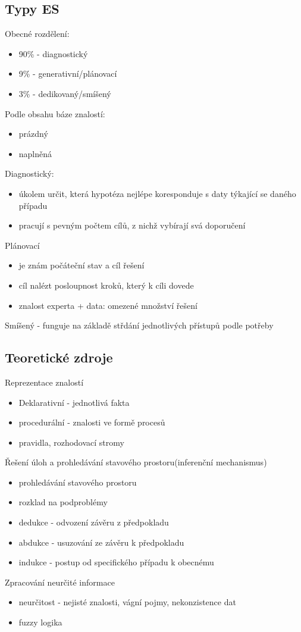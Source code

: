 \subsection{Typy ES}
Obecné rozdělení:
\begin{itemize}
    \item 90\% - diagnostický
    \item 9\% - generativní/plánovací
    \item 3\% - dedikovaný/smíšený
\end{itemize}
Podle obsahu báze znalostí:
\begin{itemize}
    \item prázdný
    \item naplněná
\end{itemize}

Diagnostický:
\begin{itemize}
    \item úkolem určit, která hypotéza nejlépe koresponduje s daty týkající se daného případu
    \item pracují s pevným počtem cílů, z nichž vybírají svá doporučení
\end{itemize}
Plánovací
\begin{itemize}
    \item je znám počáteční stav a cíl řešení
    \item cíl nalézt posloupnost kroků, který k cíli dovede
    \item znalost experta + data: omezené množství řešení
\end{itemize}

Smíšený - funguje na základě střdání jednotlivých přístupů podle potřeby\\

\subsection{Teoretické zdroje}
Reprezentace znalostí
\begin{itemize}
    \item Deklarativní - jednotlivá fakta
    \item procedurální - znalosti ve formě procesů
    \item pravidla, rozhodovací stromy
\end{itemize}
Řešení úloh a prohledávání stavového prostoru(inferenční mechanismus)
\begin{itemize}
    \item prohledávání stavového prostoru
    \item rozklad na podproblémy
    \item dedukce - odvození závěru z předpokladu
    \item abdukce - usuzování ze závěru k předpokladu
    \item indukce - postup od specifického případu k obecnému
\end{itemize}
Zpracování neurčité informace
\begin{itemize}
    \item neurčitost - nejisté znalosti, vágní pojmy, nekonzistence dat
    \item fuzzy logika
\end{itemize}

